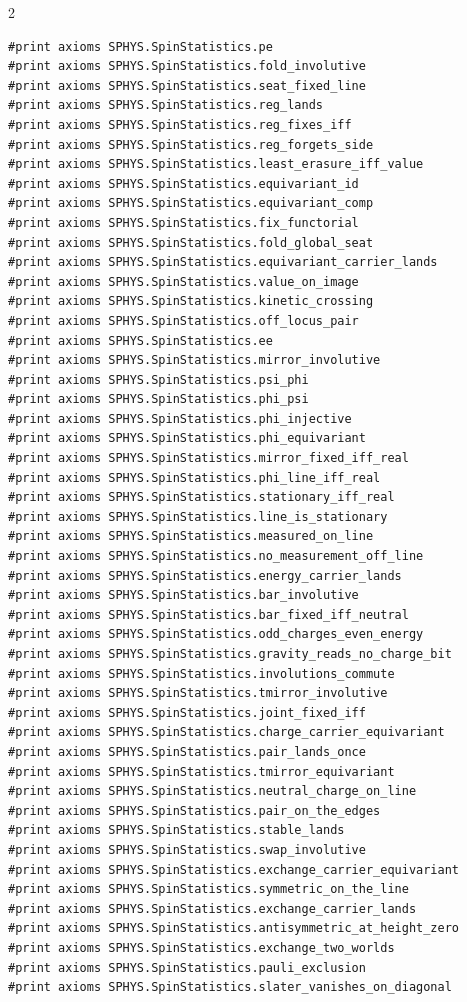 \documentclass[10pt]{article}
\begin{document}
\begin{multicols}{2}
\begin{Verbatim}[fontsize=\fontsize{6.0}{6.9}\selectfont,breaklines,breakanywhere,breaksymbolleft={}]
#print axioms SPHYS.SpinStatistics.pe
#print axioms SPHYS.SpinStatistics.fold_involutive
#print axioms SPHYS.SpinStatistics.seat_fixed_line
#print axioms SPHYS.SpinStatistics.reg_lands
#print axioms SPHYS.SpinStatistics.reg_fixes_iff
#print axioms SPHYS.SpinStatistics.reg_forgets_side
#print axioms SPHYS.SpinStatistics.least_erasure_iff_value
#print axioms SPHYS.SpinStatistics.equivariant_id
#print axioms SPHYS.SpinStatistics.equivariant_comp
#print axioms SPHYS.SpinStatistics.fix_functorial
#print axioms SPHYS.SpinStatistics.fold_global_seat
#print axioms SPHYS.SpinStatistics.equivariant_carrier_lands
#print axioms SPHYS.SpinStatistics.value_on_image
#print axioms SPHYS.SpinStatistics.kinetic_crossing
#print axioms SPHYS.SpinStatistics.off_locus_pair
#print axioms SPHYS.SpinStatistics.ee
#print axioms SPHYS.SpinStatistics.mirror_involutive
#print axioms SPHYS.SpinStatistics.psi_phi
#print axioms SPHYS.SpinStatistics.phi_psi
#print axioms SPHYS.SpinStatistics.phi_injective
#print axioms SPHYS.SpinStatistics.phi_equivariant
#print axioms SPHYS.SpinStatistics.mirror_fixed_iff_real
#print axioms SPHYS.SpinStatistics.phi_line_iff_real
#print axioms SPHYS.SpinStatistics.stationary_iff_real
#print axioms SPHYS.SpinStatistics.line_is_stationary
#print axioms SPHYS.SpinStatistics.measured_on_line
#print axioms SPHYS.SpinStatistics.no_measurement_off_line
#print axioms SPHYS.SpinStatistics.energy_carrier_lands
#print axioms SPHYS.SpinStatistics.bar_involutive
#print axioms SPHYS.SpinStatistics.bar_fixed_iff_neutral
#print axioms SPHYS.SpinStatistics.odd_charges_even_energy
#print axioms SPHYS.SpinStatistics.gravity_reads_no_charge_bit
#print axioms SPHYS.SpinStatistics.involutions_commute
#print axioms SPHYS.SpinStatistics.tmirror_involutive
#print axioms SPHYS.SpinStatistics.joint_fixed_iff
#print axioms SPHYS.SpinStatistics.charge_carrier_equivariant
#print axioms SPHYS.SpinStatistics.pair_lands_once
#print axioms SPHYS.SpinStatistics.tmirror_equivariant
#print axioms SPHYS.SpinStatistics.neutral_charge_on_line
#print axioms SPHYS.SpinStatistics.pair_on_the_edges
#print axioms SPHYS.SpinStatistics.stable_lands
#print axioms SPHYS.SpinStatistics.swap_involutive
#print axioms SPHYS.SpinStatistics.exchange_carrier_equivariant
#print axioms SPHYS.SpinStatistics.symmetric_on_the_line
#print axioms SPHYS.SpinStatistics.exchange_carrier_lands
#print axioms SPHYS.SpinStatistics.antisymmetric_at_height_zero
#print axioms SPHYS.SpinStatistics.exchange_two_worlds
#print axioms SPHYS.SpinStatistics.pauli_exclusion
#print axioms SPHYS.SpinStatistics.slater_vanishes_on_diagonal

\end{Verbatim}
\end{multicols}
\end{document}
